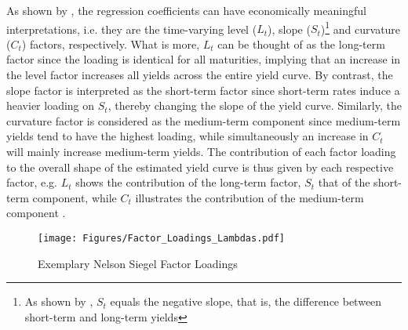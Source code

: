 As shown by \citet{diebold2006forecasting}, the regression coefficients can have economically meaningful interpretations, i.e. they are the time-varying level ($L_{t}$), slope 
%
($S_{t}$)\footnote{As shown by \citet{diebold2006forecasting}, $S_{t}$ equals the negative slope, that is, the difference between short-term and long-term yields} 
%
and curvature ($C_{t}$) factors, respectively. 
What is more, $L_{t}$ can be thought of as the long-term factor since the loading is identical for all maturities, implying that an increase in the level factor increases all yields across the entire yield curve.
By contrast, the slope factor is interpreted as the short-term factor since short-term rates induce a heavier loading on  $S_{t}$, thereby changing the slope of the yield curve.
Similarly, the curvature factor is considered as the medium-term component since medium-term yields tend to have the highest loading, while simultaneously an increase in $C_{t}$ will mainly increase medium-term yields.
The contribution of each factor loading to the overall shape of the estimated yield curve is thus given by each respective factor, e.g.  $L_{t}$ shows the contribution of the long-term factor,  $S_{t}$ that of the short-term component, while  $C_{t}$ illustrates the contribution of the medium-term component \citep{nelson1987parsimonious}.



\begin{figure}[t]
    \centering
    \texttt{[image: Figures/Factor\_Loadings\_Lambdas.pdf]}
    \caption{Exemplary Nelson Siegel Factor Loadings}
    \label{fig:factor_loadings_lambdas}
    
\end{figure}


